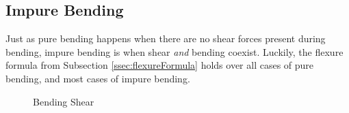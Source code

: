 \documentclass[12pt]{article}
\begin{document}
\subsection{Impure Bending}
\label{ssec:impureBending}

Just as pure bending happens when there are no shear forces present during bending, impure bending is when shear \textit{and} bending coexist. Luckily, the flexure formula from Subsection \ref{ssec:flexureFormula} holds over all cases of pure bending, and most cases of impure bending.

\begin{wrapfigure}[9]{l}{0.35\textwidth}
  \vspace{-20pt}
  \centering
  
  \caption{Bending Shear}
  \label{fig:062}
\end{wrapfigure}
\end{document}
